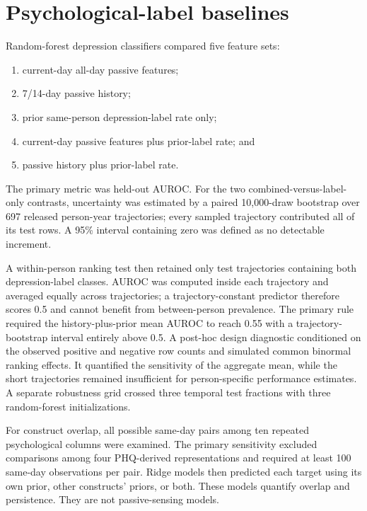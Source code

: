 \documentclass[a4paper,11pt,oneside]{report}
\begin{document}
\section{Psychological-label baselines}

Random-forest depression classifiers compared five feature sets:

\begin{enumerate}
  \item current-day all-day passive features;
  \item 7/14-day passive history;
  \item prior same-person depression-label rate only;
  \item current-day passive features plus prior-label rate; and
  \item passive history plus prior-label rate.
\end{enumerate}

The primary metric was held-out AUROC. For the two combined-versus-label-only
contrasts, uncertainty was estimated by a paired 10,000-draw bootstrap over 697
released person-year trajectories; every sampled trajectory contributed all of its
test rows. A 95\% interval containing zero was defined as no detectable increment.

A within-person ranking test then retained only test trajectories containing both
depression-label classes. AUROC was computed inside each trajectory and averaged
equally across trajectories; a trajectory-constant predictor therefore scores 0.5
and cannot benefit from between-person prevalence. The primary rule required the
history-plus-prior mean AUROC to reach 0.55 with a trajectory-bootstrap interval
entirely above 0.5. A post-hoc design diagnostic conditioned on the observed positive
and negative row counts and simulated common binormal ranking effects. It quantified
the sensitivity of the aggregate mean, while the short trajectories remained
insufficient for person-specific performance estimates. A separate robustness grid
crossed three temporal test fractions with three random-forest initializations.

For construct overlap, all possible same-day pairs among ten repeated psychological
columns were examined. The primary sensitivity excluded comparisons among four
PHQ-derived representations and required at least 100 same-day observations per
pair. Ridge models then predicted each target using its own prior, other constructs'
priors, or both. These models quantify overlap and persistence. They are not
passive-sensing models.
\end{document}

